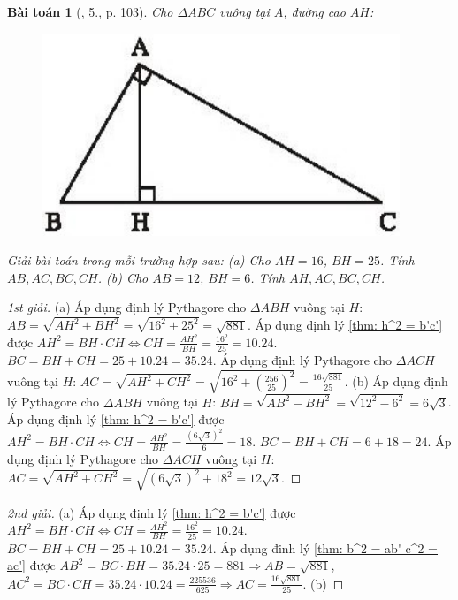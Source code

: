 \documentclass{article}
\newtheorem{baitoan}{Bài toán}
\begin{document}
\begin{baitoan}[\cite{SBT_Toan_9_tap_1}, 5., p. 103]
	Cho $\Delta ABC$ vuông tại $A$, đường cao $AH$:
	\begin{figure}[H]
		\centering
		\includegraphics[scale=.25]{SBT_Toan_9_5_p103}
	\end{figure}
	\noindent Giải bài toán trong mỗi trường hợp sau: (a) Cho $AH = 16$, $BH = 25$. Tính $AB,AC,BC,CH$. (b) Cho $AB = 12$, $BH = 6$. Tính $AH,AC,BC,CH$.
\end{baitoan}

\begin{proof}[1st giải]
	(a) Áp dụng định lý Pythagore cho $\Delta ABH$ vuông tại $H$: $AB = \sqrt{AH^2 + BH^2} = \sqrt{16^2 + 25^2} = \sqrt{881}$. Áp dụng định lý \ref{thm: h^2 = b'c'} được $AH^2 = BH\cdot CH\Leftrightarrow CH = \frac{AH^2}{BH} = \frac{16^2}{25} = 10.24$. $BC = BH + CH = 25 + 10.24 = 35.24$. Áp dụng định lý Pythagore cho $\Delta ACH$ vuông tại $H$: $AC = \sqrt{AH^2 + CH^2} = \sqrt{16^2 + \left(\frac{256}{25}\right)^2} = \frac{16\sqrt{881}}{25}$. (b) Áp dụng định lý Pythagore cho $\Delta ABH$ vuông tại $H$: $BH = \sqrt{AB^2 - BH^2} = \sqrt{12^2 - 6^2} = 6\sqrt{3}$. Áp dụng định lý \ref{thm: h^2 = b'c'} được $AH^2 = BH\cdot CH\Leftrightarrow CH = \frac{AH^2}{BH} = \frac{(6\sqrt{3})^2}{6} = 18$. $BC = BH + CH = 6 + 18 = 24$. Áp dụng định lý Pythagore cho $\Delta ACH$ vuông tại $H$: $AC = \sqrt{AH^2 + CH^2} = \sqrt{(6\sqrt{3})^2 + 18^2} = 12\sqrt{3}$.
\end{proof}

\begin{proof}[2nd giải]
	(a) Áp dụng định lý \ref{thm: h^2 = b'c'} được $AH^2 = BH\cdot CH\Leftrightarrow CH = \frac{AH^2}{BH} = \frac{16^2}{25} = 10.24$. $BC = BH + CH = 25 + 10.24 = 35.24$. Áp dụng đinh lý \ref{thm: b^2 = ab' c^2 = ac'} được $AB^2 = BC\cdot BH = 35.24\cdot25 = 881\Rightarrow AB = \sqrt{881}$, $AC^2 = BC\cdot CH = 35.24\cdot10.24 = \frac{225536}{625}\Rightarrow AC = \frac{16\sqrt{881}}{25}$. (b) 
\end{proof}
\end{document}
